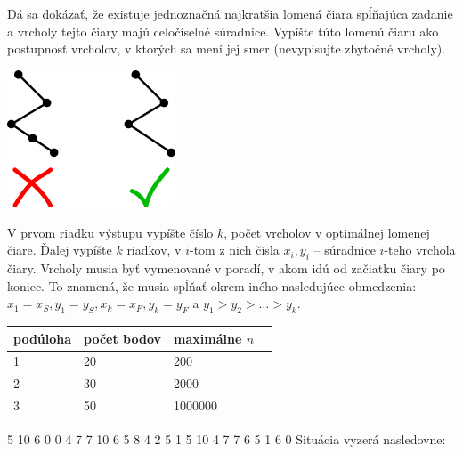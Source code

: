 
Dá sa dokázať, že existuje jednoznačná najkratšia lomená čiara spĺňajúca zadanie a vrcholy tejto
čiary majú celočíselné súradnice. Vypíšte túto lomenú čiaru ako postupnosť vrcholov, v ktorých sa
mení jej smer (nevypisujte zbytočné vrcholy).

\begin{center}
\includegraphics[width=5cm]{img/skiing1}
\end{center}

V prvom riadku výstupu vypíšte číslo $k$, počet vrcholov v optimálnej lomenej čiare. Ďalej vypíšte
$k$ riadkov, v $i$-tom z nich čísla $x_i, y_i$ -- súradnice $i$-teho vrchola čiary. Vrcholy musia
byť vymenované v poradí, v akom idú od začiatku čiary po koniec. To znamená, že musia spĺňať okrem
iného nasledujúce obmedzenia: $x_1 = x_S, y_1 = y_S, x_k = x_F, y_k = y_F$ a $y_1 > y_2 > \dots > y_k$.


\begin{center}
\begin{tabular}{|l|l|l|l|}
\hline
podúloha & počet bodov & maximálne $n$                 \\ \hline
1       & 20     & 200                                          \\ \hline
2       & 30     & 2000                                         \\ \hline
3       & 50     & 1000000                                        \\ \hline
\end{tabular}
\end{center}



5 10 6 0
0 4 7
7 10 6
5 8 4
2 5 1
5 10
4 7
7 6
5 1
6 0
\sampleCOMMENT
Situácia vyzerá nasledovne:
\sampleEND
{}


